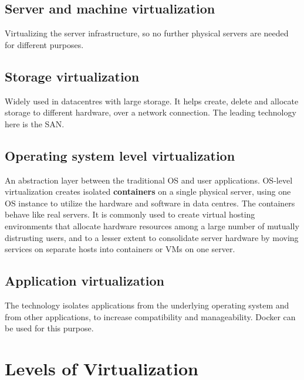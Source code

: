 \documentclass[11pt,a4paper]{article}
\begin{document}

\newpage
\subsection{Server and machine virtualization}

Virtualizing the server infrastructure, so no further physical servers are needed for
different purposes.

\subsection{Storage virtualization}

Widely used in datacentres with large storage. It helps create, delete and allocate storage
to different hardware, over a network connection. The leading technology here is the SAN.


\subsection{Operating system level virtualization}

An abstraction layer between the traditional OS and user applications. OS-level virtualization
creates isolated \textbf{containers} on a single physical server, using one OS instance to
utilize the hardware and software in data centres. The containers behave like real servers. It
is commonly used to create virtual hosting environments that allocate hardware resources among
a large number of mutually distrusting users, and to a lesser extent to consolidate server
hardware by moving services on separate hosts into containers or VMs on one server.

\subsection{Application virtualization}

The technology isolates applications from the underlying operating system and from other
applications, to increase compatibility and manageability. Docker can be used for this
purpose.

\newpage
\section{Levels of Virtualization}

\end{document}
